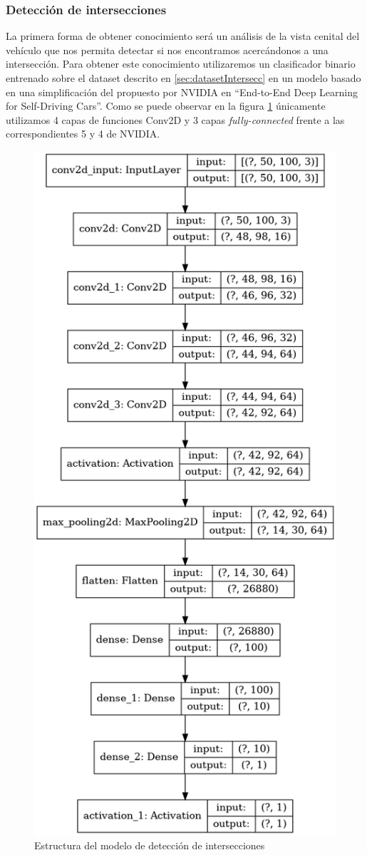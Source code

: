 \subsubsection{Detección de intersecciones}
La primera forma de obtener conocimiento será un análisis de la vista cenital del vehículo que nos permita detectar si nos encontramos acercándonos a una intersección.
Para obtener este conocimiento utilizaremos un clasificador binario entrenado sobre el dataset descrito en \ref{sec:datasetIntersecc} en un modelo basado en una simplificación del propuesto por NVIDIA en ``End-to-End Deep Learning for Self-Driving Cars''\cite{nvidiaEndToEnd}. Como se puede observar en la figura \ref{fig:diamIntersecc} únicamente utilizamos 4 capas de funciones Conv2D y 3 capas \textit{fully-connected} frente a las correspondientes 5 y 4 de NVIDIA.
\begin{figure}[h!]
    \centering
    \includegraphics[width=0.6\linewidth]{img/DiagramaIntersecciones.png}
    \caption{Estructura del modelo de detección de intersecciones}
    \label{fig:diamIntersecc}
\end{figure}

